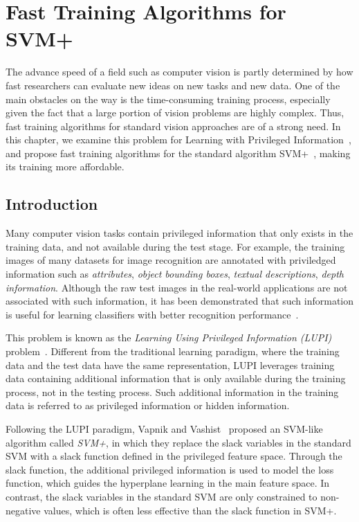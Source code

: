 \chapter{Fast Training Algorithms for SVM+}
\label{ch:svmplus}


The advance speed of a field such as computer vision is partly determined by how fast researchers can evaluate new ideas on new tasks and new data. One of the main obstacles on the way is the time-consuming training process, especially given the fact that a large portion of vision problems are highly complex.  Thus, fast training algorithms for standard vision approaches are of a strong need.  In this chapter, we examine this problem for Learning with Privileged Information~\citep{SVMplus_vapnik}, and propose fast training algorithms for the standard algorithm SVM+~\citep{SVMplus_vapnik}, making its training more affordable.  

\section{Introduction}  
Many computer vision tasks contain privileged information that only
exists in the training data, and not available during the test
stage. For example, the training images of many datasets for image
recognition are annotated with priviledged information such as
\emph{attributes}, \emph{object bounding boxes}, \emph{textual
  descriptions}, \emph{depth information}.  Although the raw test
images in the real-world applications are not associated with such
information, it has been demonstrated that such information is
useful for learning classifiers with better recognition
performance~\citep{Feyereisl2015,Lampert2013,RankTransfer,SVMplus_vapnik,Wang2015,HuaGang2014}.

This problem is known as the \emph{Learning Using Privileged
  Information (LUPI)} problem~\citep{SVMplus_vapnik}. Different from
the traditional learning paradigm, where the training data and the
test data have the same representation, LUPI leverages training data
containing additional information that is only available during the
training process, not in the testing process. Such additional
information in the training data is referred to as privileged
information or hidden information.

Following the LUPI paradigm, Vapnik and Vashist~\citep{SVMplus_vapnik}
proposed an SVM-like algorithm called \emph{SVM+}, in which they
replace the slack variables in the standard SVM with a slack function
defined in the privileged feature space. Through the slack function,
the additional privileged information is used to model the loss
function, which guides the hyperplane learning in the main feature
space. In contrast, the slack variables in the standard SVM are only
constrained to non-negative values, which is often less effective than
the slack function in SVM+.

